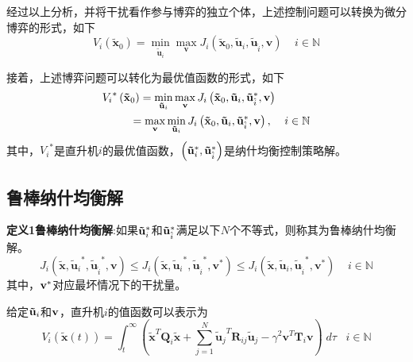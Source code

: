 经过以上分析，并将干扰看作参与博弈的独立个体，上述控制问题可以转换为微分博弈的形式，如下
\begin{equation}
  {V_i}\left( {{{{\mathbf{\tilde x}}}_0}} \right) = \mathop {\min }\limits_{{{{\mathbf{\tilde u}}}_i}} \mathop {\max }\limits_{\mathbf{v}} {J_i}\left( {{{{\mathbf{\tilde x}}}_0},{{{\mathbf{\tilde u}}}_i},{{{\mathbf{\tilde u}}}_{\hat i}},{\mathbf{v}}} \right)\;\;\;\;i \in \mathbb{N}
\end{equation}

接着，上述博弈问题可以转化为最优值函数的形式，如下
\begin{equation}
  \begin{gathered}
    {V_i}^*\left( {{{{\mathbf{\tilde x}}}_0}} \right) = \mathop {\min }\limits_{{{{\mathbf{\tilde u}}}_i}} \mathop {\max }\limits_{\mathbf{v}} {J_i}\left( {{{{\mathbf{\tilde x}}}_0},{{{\mathbf{\tilde u}}}_i},{{{\mathbf{\tilde u}}}^*}_{\hat i},{\mathbf{v}}} \right) \hfill \\
    \;\;\;\;\;\;\;\;\;\; = \mathop {\max }\limits_{\mathbf{v}} \mathop {\min }\limits_{{{{\mathbf{\tilde u}}}_i}} {J_i}\left( {{{{\mathbf{\tilde x}}}_0},{{{\mathbf{\tilde u}}}_i},{{{\mathbf{\tilde u}}}^*}_{\hat i},{\mathbf{v}}} \right),\;\;\;\;i \in \mathbb{N} \hfill \\ 
  \end{gathered} 
\end{equation}
其中，${V_i}^*$是直升机$i$的最优值函数，$\left( {{\bf{\tilde u}}_i^*,{{{\bf{\tilde u}}}^*}_{\hat i}} \right)$是纳什均衡控制策略解。
\subsection{鲁棒纳什均衡解}
\textbf{定义1鲁棒纳什均衡解}\cite{de2017finite}:如果${{\bf{\tilde u}}_i}^*$和${{\bf{\tilde u}}_{\hat i}}^*$满足以下$N$个不等式，则称其为鲁棒纳什均衡解。
\begin{equation}
  {J_i}\left( {{\mathbf{\tilde x}},{{{\mathbf{\tilde u}}}_i}^*,{{{\mathbf{\tilde u}}}_{\hat i}}^*,{\mathbf{v}}} \right) \leqslant {J_i}\left( {{\mathbf{\tilde x}},{{{\mathbf{\tilde u}}}_i}^*,{{{\mathbf{\tilde u}}}_{\hat i}}^*,{{\mathbf{v}}^*}} \right) \leqslant {J_i}\left( {{\mathbf{\tilde x}},{{{\mathbf{\tilde u}}}_i},{{{\mathbf{\tilde u}}}_{\hat i}}^*,{{\mathbf{v}}^*}} \right)\;\;\;\;i \in \mathbb{N}
\end{equation}
其中，${{\bf{v}}^*}$对应最坏情况下的干扰量。

给定${{\bf{\tilde u}}_i}$和${\bf{v}}$，直升机$i$的值函数可以表示为
\begin{equation}
  {V_i}\left( {{\mathbf{\tilde x}}\left( t \right)} \right) = \int_t^\infty  {\left( {{{{\mathbf{\tilde x}}}^T}{{\mathbf{Q}}_i}{\mathbf{\tilde x}} + \sum\limits_{j = 1}^N {{{{\mathbf{\tilde u}}}_j}^T{{\mathbf{R}}_{ij}}{{{\mathbf{\tilde u}}}_j} - {\gamma ^2}{{\mathbf{v}}^T}{{\mathbf{T}}_i}{\mathbf{v}}} } \right)} \;d\tau \;\;\;i \in \mathbb{N}
  \label{equation:chap_4_1_20}
\end{equation}

